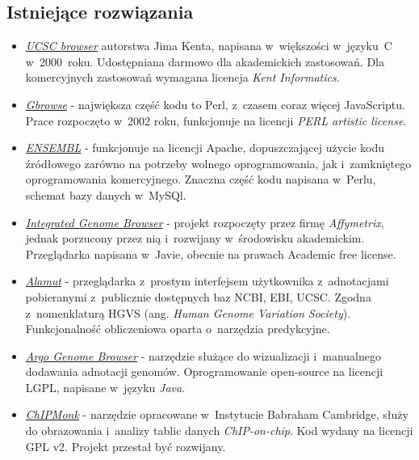 \documentclass[a4paper,12pt,oneside]{mwrep}  %
\begin{document}
\subsection{Istniejące rozwiązania}
\begin{itemize}
\item \href{https://genome.ucsc.edu}{\emph{UCSC browser}} \label{UCSC}
autorstwa Jima Kenta, napisana w~większości w~języku~C w~2000~roku. Udostępniana darmowo dla akademickich zastosowań. Dla komercyjnych zastosowań wymagana licencja \emph{Kent Informatics}. %

\item \href{http://gbrowse.org}{\emph{Gbrowse}} - \label{Gbrowse}
największa część kodu to Perl, z~czasem coraz więcej JavaScriptu. Prace rozpoczęto w~2002 roku, funkcjonuje na licencji \emph{PERL artistic license}. %

\item \href{http://www.ensembl.org}{\emph{ENSEMBL}} \label{ENSEMBL}
- funkcjonuje na licencji Apache, dopuszczającej użycie kodu źródłowego zarówno na potrzeby wolnego oprogramowania, jak i~zamkniętego oprogramowania komercyjnego. Znaczna część kodu napisana w~Perlu, schemat bazy danych w~MySQl. %

\item \href{http://bioviz.org/igb/index.html}{\emph{Integrated Genome Browser}} \label{IGB}
- projekt rozpoczęty przez firmę \emph{Affymetrix}, jednak porzucony przez nią i~rozwijany w~środowisku akademickim. Przeglądarka napisana w~Javie, obecnie na prawach Academic free license. %
 
\item \href{http://www.interactive-biosoftware.com/alamut-visual/features/}{\emph{Alamut}} \label{alamut}- przeglądarka z~prostym interfejsem użytkownika z~adnotacjami pobieranymi z~publicznie dostępnych baz NCBI, EBI, UCSC. Zgodna z~nomenklaturą HGVS (ang. \emph{Human Genome Variation Society}). Funkcjonalność obliczeniowa oparta o~narzędzia predykcyjne.

\item \href{http://www.broadinstitute.org/annotation/argo/}{\emph{Argo Genome Browser}} \label{argo-genome-browser}- narzędzie służące do wizualizacji i~manualnego dodawania adnotacji genomów. Oprogramowanie open-source na licencji LGPL, napisane w~języku \emph{Java}.

\item \href{http://www.bioinformatics.babraham.ac.uk/projects/chipmonk/}{\emph{ChIPMonk}} \label{chipmonk}- narzędzie opracowane w~Instytucie Babraham Cambridge, służy do obrazowania i~analizy tablic danych \emph{ChIP-on-chip}. Kod wydany na licencji GPL v2. Projekt przestał być rozwijany.


\end{itemize}
\end{document}
